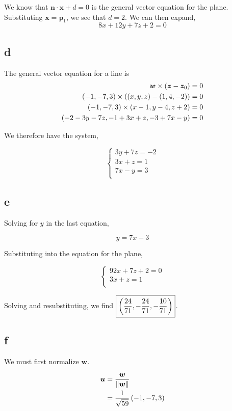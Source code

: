 \documentclass{article}
\begin{document}
We know that $\bm{n} \cdot \bm{x} + d = 0$ is the general vector equation for the plane.
Substituting $\bm{x} = \bm{p}_1$, we see that $d=2$.
We can then expand,
$$
\boxed{8x + 12y + 7z + 2 =0}
$$

\subsection*{d}

The general vector equation for a line is
\begin{align*}
  \bm{w} \times \left ( \bm{z} - \bm{z}_0 \right) &= 0 \\
  \left ( -1, -7, 3 \right) \times \left ( \left ( x, y, z \right) - \left ( 1, 4, -2 \right) \right) &= 0 \\
  \left ( -1, -7, 3 \right) \times \left ( x - 1, y - 4, z + 2 \right) &= 0 \\
  \left ( -2 - 3y - 7z, -1+3x+z, -3 + 7x - y \right) &= 0 \\
\end{align*}

We therefore have the system,

$$
\begin{cases}
  3y + 7z = -2 \\
  3x + z = 1 \\
  7x - y = 3 \\
\end{cases}
$$

\subsection*{e}
Solving for $y$ in the last equation,

$$
y = 7x - 3
$$

Substituting into the equation for the plane,

$$
\begin{cases}
  92x + 7z + 2 = 0 \\
  3x + z = 1 \\
\end{cases}
$$

Solving and resubstituting, we find $\boxed{\left ( \frac{24}{71}, - \frac{24}{71}, - \frac{10}{71} \right)}$.

\subsection*{f}

We must first normalize $\bm{w}$.

\begin{align*}
  \bm{u} &= \frac{\bm{w}}{\left\lVert\bm{w}\right\rVert} \\
  &= \frac{1}{\sqrt{59}} \left ( -1, -7, 3 \right) \\
\end{align*}
\end{document}
